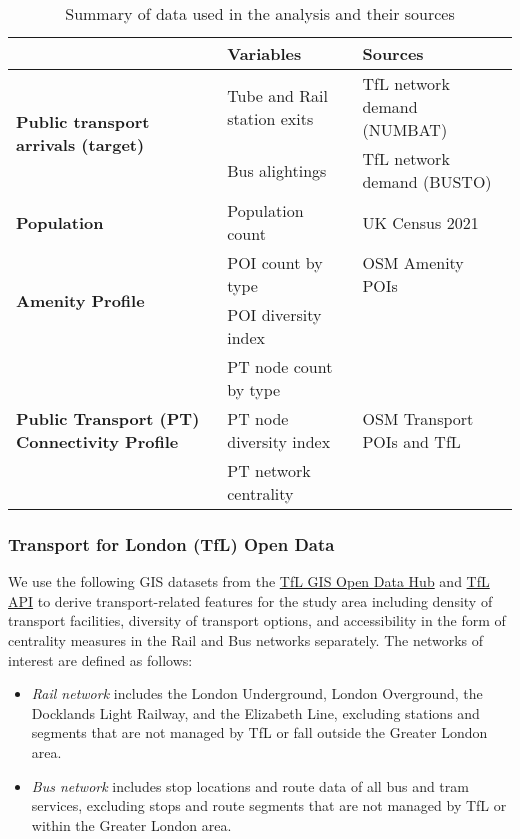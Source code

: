 \begin{table}[ht]
    \centering
    \renewcommand{\arraystretch}{1.5}
    \begin{tabular}{|l|l|l|}
        \hline 
        \rowcolor{lightgray}
        \textbf{} & \textbf{Variables} & \textbf{Sources} \\
        \hline

        \multirow{2}{12em}{\textbf{Public transport arrivals (target)}} 
        & Tube and Rail station exits & TfL network demand (NUMBAT) \\ 
        & Bus alightings & TfL network demand (BUSTO) \\
        \hline

        \textbf{Population} & Population count & UK Census 2021 \\
        \hline

        \multirow{2}{12em}{\textbf{Amenity Profile}} 
        & POI count by type & OSM Amenity POIs \\ 
        & POI diversity index & \\ 
        \hline 

        \multirow{3}{12em}{\textbf{Public Transport (PT) Connectivity Profile}} 
        & PT node count by type &  \\
        & PT node diversity index & OSM Transport POIs and TfL \\
        & PT network centrality &  \\
        \hline

            \end{tabular}
    \caption{Summary of data used in the analysis and their sources}
    \label{tab:datasources}
\end{table}

\subsubsection*{Transport for London (TfL) Open Data}

We use the following GIS datasets from the \href{https://gis-tfl.opendata.arcgis.com/}{TfL GIS Open Data Hub} and \href{https://api.tfl.gov.uk/}{TfL API} to derive transport-related features for the study area including density of transport facilities, diversity of transport options, and accessibility in the form of centrality measures in the Rail and Bus networks separately. The networks of interest are defined as follows:

\begin{itemize}
    \setlength\itemsep{0em}
    \item \textit{Rail network} includes the London Underground, London Overground, the Docklands Light Railway, and the Elizabeth Line, excluding stations and segments that are not managed by TfL or fall outside the Greater London area.
    \item \textit{Bus network} includes stop locations and route data of all bus and tram services, excluding stops and route segments that are not managed by TfL or within the Greater London area.
\end{itemize}

